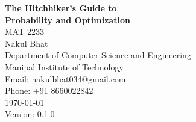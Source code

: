 \newcommand{\titlepagebreak}{\\[1em]}
\begin{titlepage}
    \vspace*{\fill} %

    \centering
    {\Huge \bfseries The Hitchhiker's Guide to\titlepagebreak Probability and Optimization}\\[1in]
    
    {\Large MAT 2233}\\[0.75in]
    
    {\huge Nakul Bhat}\\[0.5in]
    
    {\large Department of Computer Science and Engineering \titlepagebreak Manipal Institute of Technology}\\[0.5in]
    
    {\large Email: nakulbhat034@gmail.com \titlepagebreak Phone: +91 8660022842}\\[1.5cm]
    
    {\large \today}\\[0.5cm]
    
    {\large Version: 0.1.0}

    \vspace*{\fill} %
\end{titlepage}
\restoregeometry